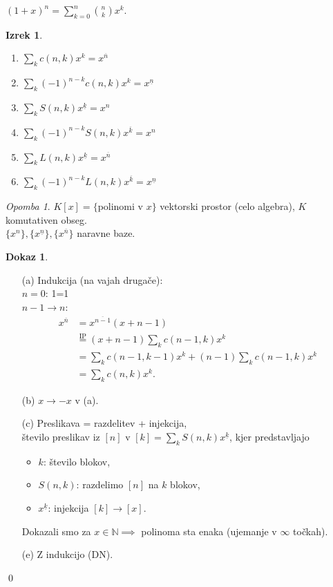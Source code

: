 \documentclass[a4paper, 12pt]{book}
\theoremstyle{definition}
\newtheorem{theorem}[counter]{Izrek}
\newtheorem{pro}[counter]{Dokaz}
\theoremstyle{remark}
\newtheorem*{rem}{Opomba}
\newcommand{\N}{\mathbb{N}}
\begin{document}
$(1+x)^n = \sum_{k=0}^{n} \binom{n}{k} x^k$.
\begin{theorem} \text{}
  \begin{enumerate}[label={(\alph*)}]
    \item $\sum_k c(n,k) x^k = x^{\overline{n}}$
    \item $\sum_k (-1)^{n-k} c(n,k) x^k = x^{\underline{n}}$
    \item $\sum_k S(n,k) x^{\underline{k}} = x^{n}$
    \item $\sum_k (-1)^{n-k} S(n,k) x^{\overline{k}} = x^{n}$
    \item $\sum_k L(n,k) x^{\underline{k}} = x^{\overline{n}}$
    \item $\sum_k (-1)^{n-k} L(n,k) x^{\overline{k}} = x^{\underline{n}}$
  \end{enumerate}
\end{theorem}
\begin{rem}
  $K[x] = \{$polinomi v $x\}$ vektorski prostor (celo algebra), $K$ komutativen obseg. \\
  $\{x^n\}, \{x^{\underline{n}}\}, \{x^{\overline{n}}\}$ naravne baze.
\end{rem}
\begin{pro} \text{}
  \begin{enumerate}
    \item[(a)] Indukcija (na vajah drugače): \\
      $n=0$: 1=1 \\
      $n-1\to n$:
        \begin{align*}
          x^{\overline{n}} &= x^{\overline{n-1}}(x+n-1) \\
          &\stackrel{\text{IP}}{=} (x+n-1) \sum_k c(n-1,k) x^k \\
          &= \sum_k c(n-1,k-1) x^k + (n-1) \sum_k c(n-1,k) x^k \\
          &= \sum_k c(n,k) x^k.
        \end{align*}
    \item[(b)] $x \to -x$ v (a).
    \item[(c)] Preslikava = razdelitev + injekcija, \\
      število preslikav iz $[n]$ v $[k] = \sum_k S(n,k) x^{\underline{k}}$, kjer predstavljajo
      \begin{itemize}
        \item $k$: število blokov,
        \item $S(n,k)$: razdelimo $[n]$ na $k$ blokov,
        \item $x^{\underline{k}}$: injekcija $[k] \to [x]$.
      \end{itemize}
      Dokazali smo za $x \in \N \implies$ polinoma sta enaka (ujemanje v $\infty$ točkah).
    \item[(e)] Z indukcijo (DN).
  \end{enumerate}
  \qed
\end{pro}
\end{document}
